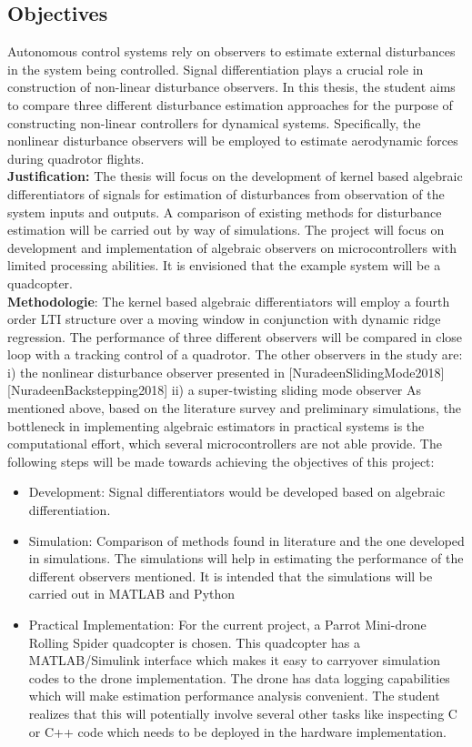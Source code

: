 \documentclass{article}
\begin{document}
\subsection{Objectives}
Autonomous control systems rely on observers to estimate external disturbances in the system being controlled. Signal differentiation plays a crucial role in construction of non-linear disturbance observers. In this thesis, the student aims to compare three different disturbance estimation approaches for the purpose of constructing non-linear controllers for dynamical systems. Specifically, the nonlinear disturbance observers will be employed to estimate aerodynamic forces during quadrotor flights. \\
\textbf{Justification:} The thesis will focus on the development of kernel based algebraic differentiators of signals for estimation of disturbances from observation of the system inputs and outputs. A comparison of existing methods for
disturbance estimation will be carried out by way of simulations.  
The project will focus on development and implementation of algebraic observers on microcontrollers with limited processing abilities. It is envisioned that the example system will be a quadcopter.\\
\textbf{Methodologie}: The kernel based algebraic differentiators will employ a fourth order LTI structure over a moving window in conjunction with dynamic ridge regression. 
The performance of three different observers will be compared in close loop with a tracking control of a quadrotor. The other observers in the study are:
i) the nonlinear disturbance observer presented in [NuradeenSlidingMode2018] [NuradeenBackstepping2018]
ii) a super-twisting sliding mode observer
As mentioned above, based on the literature survey and preliminary simulations, the bottleneck in implementing algebraic estimators in practical systems is the computational effort, which several microcontrollers are not able provide.
The following steps will be made towards achieving the objectives of this project: 
\begin{itemize}
\item Development: Signal differentiators would be developed based on algebraic differentiation. 
\item Simulation: Comparison of methods found in literature and the one developed in simulations. The simulations will help in estimating the performance of the different observers mentioned. It is intended that the simulations will be carried out in MATLAB and Python
\item Practical Implementation: For the current project, a Parrot Mini-drone Rolling Spider quadcopter is chosen. This quadcopter has a MATLAB/Simulink interface which makes it easy to carryover simulation codes to the drone implementation. The drone has data logging capabilities which will make estimation performance analysis convenient. The student realizes that this will potentially involve several other tasks like inspecting C or C++ code which needs to be deployed in the hardware implementation.
\end{itemize}
	 
\end{document}
